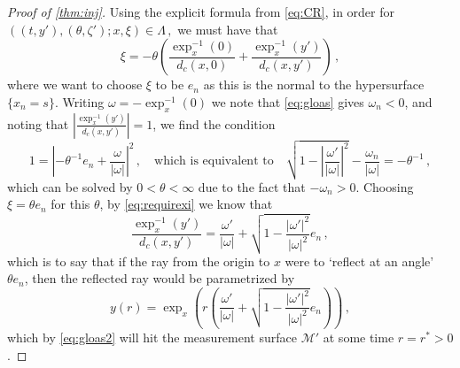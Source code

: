 \documentclass[
	fontsize=11pt, 
	twoside=false, 
	abstract=true, 
	a4paper,
]{scrartcl}
\newcommand{\abs}[1]{\left\lvert#1\right\rvert}
\begin{document}
\begin{proof}[Proof of \cref{thm:inj}]

	Using the explicit formula from \cref{eq:CR}, in order for $((t,y'),(\theta,\zeta');x, \xi) \in \Lambda\,,$ we must have that 
	\begin{equation}\label{eq:requirexi}
		\xi = -\theta\left(\frac{\exp_{x}^{-1}(0)}{d_c(x,0)} + \frac{\exp_x^{-1}(y')}{d_c(x,y')}\right)\,,
	\end{equation}
	where we want to choose $\xi$ to be $e_n$ as this is the normal to the hypersurface $\{x_n=s\}$. %
	Writing $\omega= -\exp_x^{-1}(0)$ we note that \cref{eq:gloas} gives $\omega_n < 0$, and noting that $\abs{\frac{\exp_x^{-1}(y')}{d_c(x,y')}}=1$, we find the condition 
	\[
		1 = \abs{-\theta^{-1}e_n + \frac{\omega}{\abs{\omega}}}^2\,,\quad\text{which is equivalent to}\quad \sqrt{1-\abs{\frac{\omega'}{\abs{\omega}}}^2} - \frac{\omega_n}{\abs{\omega}} = -\theta^{-1}\,,
	\]
	which can be solved by $0<\theta<\infty$ due to the fact that $-\omega_n > 0$. Choosing $\xi = \theta e_n$ for this $\theta$, by \cref{eq:requirexi} we know that 
	\[
		\frac{\exp_x^{-1}(y')}{d_c(x,y')} = \frac{\omega'}{\abs{\omega}}+ \sqrt{1-\frac{\abs{\omega'}^2}{\abs{\omega}^2}}e_n\,,
	\]
	which is to say that if the ray from the origin to $x$ were to `reflect at an angle' $\theta e_n$, then the reflected ray would be parametrized by
	\[
		y(r) = \exp_x\left(r\left( \frac{\omega'}{\abs{\omega}}+ \sqrt{1-\frac{\abs{\omega'}^2}{\abs{\omega}^2}}e_n\right)\right)\,,
	\]
	which by \cref{eq:gloas2} will hit the measurement surface $\mathcal{M}'$ at some time $r=r^\ast > 0$. 


\end{proof}
\end{document}
